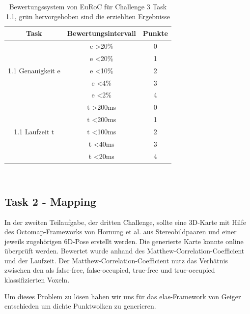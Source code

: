 \documentclass[12pt,titlepage, a4paper]{article}
\begin{document}
\begin{table}
\centering
\begin{tabular}{c|c|c}
Task & Bewertungsintervall & Punkte\\
\hline
\multirow{5}{*}{1.1 Genauigkeit e} & e \textgreater 20\% & 0 \\
 & e \textless 20\% & 1\\  
  & e \textless 10\% & 2\\
   & e \textless 4\% & 3\\
 &\cellcolor{green!10.0} e \textless 2\% & \cellcolor{green!10.0}4\\
\hline
\multirow{5}{*}{1.1 Laufzeit t} & t \textgreater 200ms & 0 \\
 & t \textless 200ms & 1\\  
  & t \textless 100ms & 2\\
  & \cellcolor{green!10.0}t \textless 40ms &\cellcolor{green!10.0} 3\\
 & t \textless 20ms & 4\\
\hline
\end{tabular}\\
\vspace{10mm}
\caption{Bewertungssystem von EuRoC für Challenge 3 Task 1.1, grün hervorgehoben sind die erziehlten Ergebnisse}
\label{table:scoringt1}
\end{table}
				
\subsection{Task 2 - Mapping}
In der zweiten Teilaufgabe, der dritten Challenge, sollte eine 3D-Karte mit Hilfe des Octomap-Frameworks von Hornung et al. aus Stereobildpaaren und einer jeweils zugehörigen 6D-Pose erstellt werden. Die generierte Karte konnte online überprüft werden. Bewertet wurde anhand des Matthew-Correlation-Coefficient und der Laufzeit. Der Matthew-Correlation-Coefficient nutz das Verhätnis zwischen den als false-free, false-occupied, true-free und true-occupied klassifizierten Voxeln.

Um dieses Problem zu lösen haben wir uns für das elas-Framework von Geiger entschieden um dichte Punktwolken zu generieren.
\end{document}
